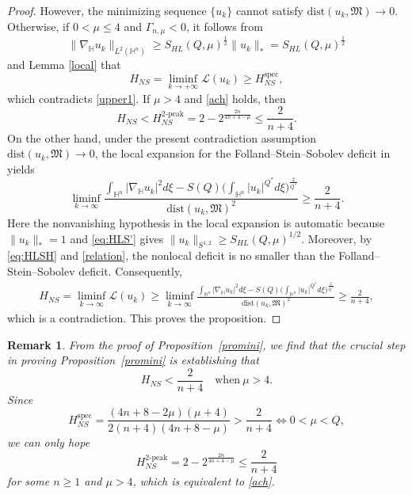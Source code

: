 \documentclass[10pt,a4paper]{amsart}
\newtheorem{remark}{Remark}[section]
\begin{document}
\begin{proof}
However, the minimizing sequence $\{u_k\}$ cannot satisfy $\mathrm{dist}(u_k,\mathfrak{M})\rightarrow 0$. Otherwise, if $0<\mu\leq4$ and $\Gamma_{n,\mu}<0$, it follows from
\begin{equation*}
\|\nabla_\mathbb{H} u_k\|_{L^2(\mathbb{H}^n)}\geq S_{HL}(Q,\mu)^{\frac{1}{2}} \|u_k\|_*=S_{HL}(Q,\mu)^{\frac{1}{2}}
\end{equation*}
and Lemma \ref{local} that
\begin{equation*}
 H_{NS}= \liminf\limits_{k\rightarrow+\infty}\mathcal{L}(u_k){\geq}H_{NS}^{\mathrm{spec}},
\end{equation*}
which contradicts \eqref{upper1}. If $\mu>4$ and \eqref{ach} holds, then
\begin{equation*}
 H_{NS}<H_{NS}^{2\text{-peak}}= 2-2^{\frac{2n}{4n+4-\mu}} \leq\frac{2}{n+4}.
\end{equation*}
{On the other hand, under the present contradiction assumption $\mathrm{dist}(u_k,\mathfrak M)\to0$, the local expansion for the Folland--Stein--Sobolev deficit in \cite{LZ15} yields
\begin{equation*}
 \liminf_{k\to\infty}
 \frac{\int_{\mathbb{H}^{n}}|\nabla_{\mathbb{H}} u_k|^{2}{d}\xi-S(Q)\big(\int_{\mathbb{H}^{n}}|u_k|^{Q^{\ast}}d\xi\big)^{\frac{2}{Q^{\ast}}}}{\mathrm{dist}(u_k,\mathfrak{M})^2}\geq \frac{2}{n+4}.
\end{equation*}
Here the nonvanishing hypothesis in the local expansion is automatic because $\|u_k\|_*=1$ and \eqref{eq:HLS'} gives $\|u_k\|_{S^{1,2}}\ge S_{HL}(Q,\mu)^{1/2}$. Moreover, by \eqref{eq:HLSH} and \eqref{relation}, the nonlocal deficit is no smaller than the Folland--Stein--Sobolev deficit. Consequently,
\begin{align*}
 H_{NS}=\liminf_{k\to\infty}\mathcal{L}(u_k)
 \geq \liminf_{k\to\infty}
 \frac{\int_{\mathbb{H}^{n}}|\nabla_{\mathbb{H}} u_k|^{2}{d}\xi-S(Q)\big(\int_{\mathbb{H}^{n}}|u_k|^{Q^{\ast}}d\xi\big)^{\frac{2}{Q^{\ast}}}}{\mathrm{dist}(u_k,\mathfrak{M})^2}
 \geq\frac{2}{n+4},
\end{align*}
which is a contradiction.} This proves the proposition.
\end{proof}

\begin{remark}
{\rm From the proof of Proposition~\ref{promini}, we find that the crucial step in proving Proposition~\ref{promini} is establishing that
\begin{equation*}
 H_{NS}<\frac{2}{n+4}\quad \mathrm{when}~\mu>4.
\end{equation*}
Since
\begin{equation*}
 H_{NS}^{\mathrm{spec}}=\frac{(4n+8-2\mu)(\mu+4)}{2(n+4)(4n+8-\mu)}>\frac{2}{n+4} \Longleftrightarrow 0<\mu<Q,
\end{equation*}
we can only hope
\begin{equation*}
 H_{NS}^{2\text{-peak}}=2-2^{\frac{2n}{4n+4-\mu}} \leq\frac{2}{n+4}
\end{equation*}
for some $n\geq1$ and $\mu>4$,
which is equivalent to \eqref{ach}.
}
\end{remark}
\end{document}
